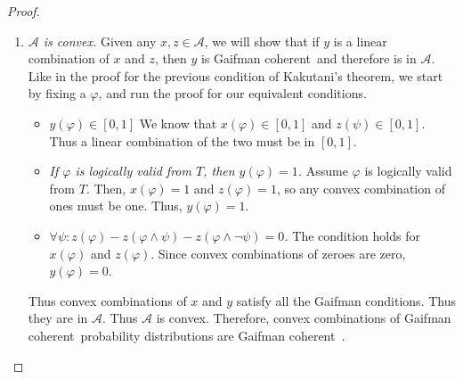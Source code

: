 \documentclass[12pt]{article}
\newcommand{\vp}{\varphi}
\newcommand{\coh}{coherent}
\newcommand{\gcoh}{Gaifman \coh~}
\theoremstyle{plain}
\theoremstyle{definition}
\theoremstyle{remark}
\begin{document}
\begin{proof}
\begin{enumerate}
We can form a sequence of points $x_i$ converging to $x$ where all $x_i$ are in $\mathcal{A}$.
Note that convergence is equivalent to convergence with respect to every individual $\vp$ because we are in the product topology.
We will now prove that $x$ is also in $\mathcal{A}$ by showing that $x$ must satisfy the Gaifman conditions with respect to any $\vp$. 
Fix a $\vp$.
We take the sequence of reals $x_i(\vp)$.
\begin{itemize}
\item \emph{$x(\vp)\in [0,1]$.}
Note that $x_i(\vp)$ is a sequence of real numbers all in the interval $[0, 1]$.
Thus they must converge to a real number within that interval, so $x(\vp)\in[0,1]$.
\item \emph{If $\vp$ is logically valid from $T$, then $x(\vp)=1$.}
This condition only applies if $\vp$ is logically valid in $T$, so assume that that is true.
Since every $x_i$ is \gcoh, this implies that $x_i(\vp)$ are all $1$. Thus they converge to $1$.
\item $\forall \psi: x(\vp) -x(\vp\wedge\psi)-x(\vp\wedge\neg\psi)=0$.
(Note that we have rewritten the condition to make this part clearer.)
Fix a $\psi$.
Since the $x_i$'s are all \gcoh, $\forall i\forall \psi: x_i(\vp) -x_i(\vp\wedge\psi)-x_i(\vp\wedge\neg\psi)=0.$
This is a sequence of zeroes, so it must converge to zero, so $x$ fulfills this condition.
\end{itemize}
Note that our choices of $\vp$ and $\psi$ were arbitrary. Thus the conditions hold for all $\vp$ and $\psi$. This implies that the limit $x$ is \gcoh and therefore $\mathcal{A}$ is closed.
Thus $\mathcal{A}$ is compact.

\item \emph{$\mathcal{A}$ is convex.}
Given any $x,z\in\mathcal{A}$, we will show that if $y$ is a linear combination of $x$ and $z$, then $y$ is \gcoh and therefore is in $\mathcal{A}$.
Like in the proof for the previous condition of Kakutani's theorem, we start by fixing a $\vp$, and run the proof for our equivalent conditions.
\begin{itemize}
\item \emph{$y(\vp) \in [0, 1]$}
We know that $x(\vp) \in [0,1]$ and $z(\psi) \in [0,1]$.
Thus a linear combination of the two must be in $[0,1]$.
\item \emph{If $\vp$ is logically valid from $T$, then $y(\vp)=1$.}
Assume $\vp$ is logically valid from $T$.
Then, $x(\vp)=1$ and $z(\vp)=1$, so any convex combination of ones must be one.
Thus, $y(\vp) = 1$.
\item \emph{$\forall \psi: z(\vp) -z(\vp\wedge\psi)-z(\vp\wedge\neg\psi)=0$.}
The condition holds for $x(\vp)$ and $z(\vp)$.
Since convex combinations of zeroes are zero, $y(\vp)=0$.
\end{itemize}
Thus convex combinations of $x$ and $y$ satisfy all the Gaifman conditions. Thus they are in $\mathcal{A}$. Thus $\mathcal{A}$ is convex.
Therefore, convex combinations of \gcoh probability distributions are \gcoh.


\end{enumerate}
\end{proof}
\end{document}
